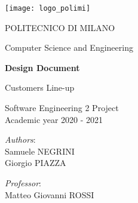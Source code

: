 \begin{titlingpage}
	\begin{center}
		\texttt{[image: logo\_polimi]}

		\vspace{0.25cm}

		\LARGE POLITECNICO DI MILANO\\

		\vspace{0.2cm}

		\Large Computer Science and Engineering

		\vspace{0.8cm}

		\Huge \textbf{Design Document}

		\vspace{0.5cm}
		\huge Customers Line-up

		\vspace{1.5cm}
		\LARGE Software Engineering 2 Project\\
		\Large Academic year 2020 - 2021

		\vspace{3cm}

		\large
		\begin{minipage}{.1\textwidth}
			\null
		\end{minipage}%
		\begin{minipage}{.4\textwidth}
			\textit{Authors}:\\
			Samuele NEGRINI\\
			Giorgio PIAZZA
		\end{minipage}%
		\begin{minipage}{.4\textwidth}
			\raggedleft
			\textit{Professor}:\\
			Matteo Giovanni ROSSI\\
			\phantom{placeholder}
		\end{minipage}%
		\begin{minipage}{.1\textwidth}
			\null
		\end{minipage}


		\end{center}
\end{titlingpage}